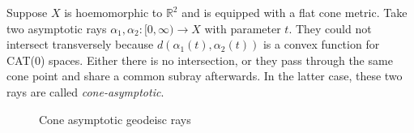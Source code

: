 \documentclass[reqno]{amsart}
\theoremstyle{plain}
\theoremstyle{definition}
\theoremstyle{remark}
\theoremstyle{definition}
\newcommand{\R}{\mathbb R}
\newcommand{\?}{\textcolor{red}{?}}
\begin{document}
Suppose $X$ is hoemomorphic to $\R^2$ and is equipped with a flat cone metric. Take two asymptotic rays $\alpha_1,\alpha_2:[0,\infty)\to X$ with parameter $t$. They could not intersect transversely because $d(\alpha_1(t),\alpha_2(t))$ is a convex function for CAT(0) spaces. Either there is no intersection, or they pass through the same cone point and share a common subray afterwards. In the latter case, these two rays are called \textit{cone-asymptotic}.

\begin{figure}[h]
    \centering
    \caption{Cone asymptotic geodeisc rays}
    \label{asymptotic}
\end{figure}
\end{document}
